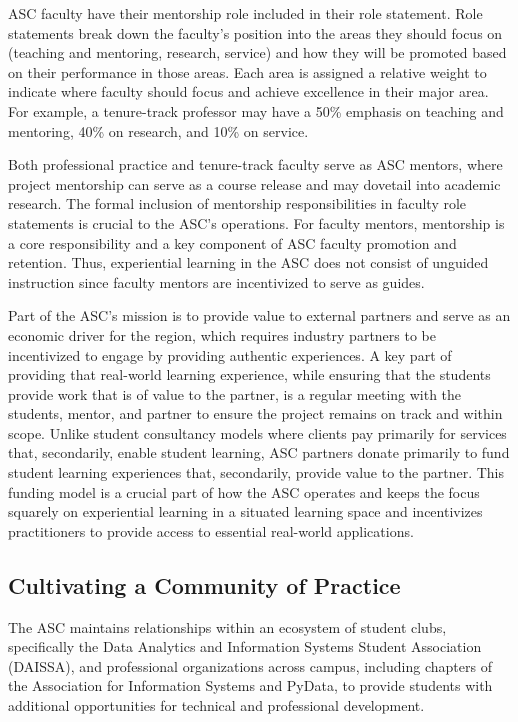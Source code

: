 \documentclass[
  12pt]{article}
\begin{document}
ASC faculty have their mentorship role included in their role statement.
Role statements break down the faculty's position into the areas they
should focus on (teaching and mentoring, research, service) and how they
will be promoted based on their performance in those areas. Each area is
assigned a relative weight to indicate where faculty should focus and
achieve excellence in their major area. For example, a tenure-track
professor may have a 50\% emphasis on teaching and mentoring, 40\% on
research, and 10\% on service.

Both professional practice and tenure-track faculty serve as ASC
mentors, where project mentorship can serve as a course release and may
dovetail into academic research. The formal inclusion of mentorship
responsibilities in faculty role statements is crucial to the ASC's
operations. For faculty mentors, mentorship is a core responsibility and
a key component of ASC faculty promotion and retention. Thus,
experiential learning in the ASC does not consist of unguided
instruction since faculty mentors are incentivized to serve as guides.

Part of the ASC's mission is to provide value to external partners and
serve as an economic driver for the region, which requires industry
partners to be incentivized to engage by providing authentic
experiences. A key part of providing that real-world learning
experience, while ensuring that the students provide work that is of
value to the partner, is a regular meeting with the students, mentor,
and partner to ensure the project remains on track and within scope.
Unlike student consultancy models where clients pay primarily for
services that, secondarily, enable student learning, ASC partners donate
primarily to fund student learning experiences that, secondarily,
provide value to the partner. This funding model is a crucial part of
how the ASC operates and keeps the focus squarely on experiential
learning in a situated learning space and incentivizes practitioners to
provide access to essential real-world applications.

\subsection{Cultivating a Community of
Practice}\label{cultivating-a-community-of-practice}

The ASC maintains relationships within an ecosystem of student clubs,
specifically the Data Analytics and Information Systems Student
Association (DAISSA), and professional organizations across campus,
including chapters of the Association for Information Systems and
PyData, to provide students with additional opportunities for technical
and professional development.
\end{document}
